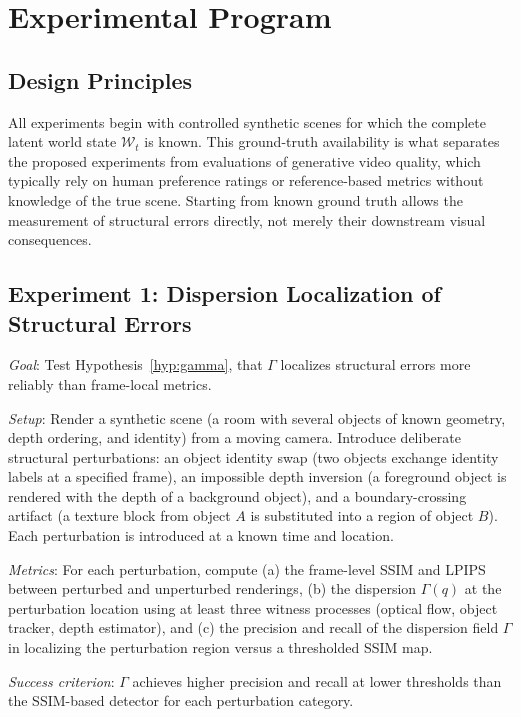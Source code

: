 \documentclass[12pt,a4paper]{article}
\theoremstyle{plain}
\theoremstyle{definition}
\theoremstyle{remark}
\begin{document}
\section{Experimental Program}
\label{sec:experiments}

\subsection{Design Principles}

All experiments begin with controlled synthetic scenes for which the complete latent world state $\mathcal{W}_t$ is known. This ground-truth availability is what separates the proposed experiments from evaluations of generative video quality, which typically rely on human preference ratings or reference-based metrics without knowledge of the true scene. Starting from known ground truth allows the measurement of structural errors directly, not merely their downstream visual consequences.

\subsection{Experiment 1: Dispersion Localization of Structural Errors}

\textit{Goal}: Test Hypothesis~\ref{hyp:gamma}, that $\Gamma$ localizes structural errors more reliably than frame-local metrics.

\textit{Setup}: Render a synthetic scene (a room with several objects of known geometry, depth ordering, and identity) from a moving camera. Introduce deliberate structural perturbations: an object identity swap (two objects exchange identity labels at a specified frame), an impossible depth inversion (a foreground object is rendered with the depth of a background object), and a boundary-crossing artifact (a texture block from object $A$ is substituted into a region of object $B$). Each perturbation is introduced at a known time and location.

\textit{Metrics}: For each perturbation, compute (a) the frame-level SSIM and LPIPS between perturbed and unperturbed renderings, (b) the dispersion $\Gamma(q)$ at the perturbation location using at least three witness processes (optical flow, object tracker, depth estimator), and (c) the precision and recall of the dispersion field $\Gamma$ in localizing the perturbation region versus a thresholded SSIM map.

\textit{Success criterion}: $\Gamma$ achieves higher precision and recall at lower thresholds than the SSIM-based detector for each perturbation category.
\end{document}
